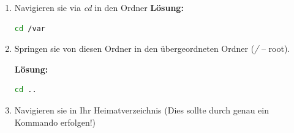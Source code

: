 \documentclass[paper=a4,fontsize=11pt]{scrartcl}%
\numberwithin{equation}{section}
\newenvironment{solution}
	{
		\color{blue}
		\textbf{Lösung:}
	}{}
\begin{document}
\begin{enumerate}
\begin{enumerate}[label=(\alph*)]
		\begin{solution}
		\begin{lstlisting}[style=Bash, language=Bash]
ls
		\end{lstlisting}
		\end{solution}
		\item Navigieren sie via \emph{cd} in den Ordner 
		\begin{solution}
		\begin{lstlisting}[style=Bash, language=Bash]
cd /var
		\end{lstlisting}
		\end{solution}
		\item Springen sie von diesen Ordner in den übergeordneten Ordner (\emph{/} -- root).
		
		\begin{solution}
		\begin{lstlisting}[style=Bash, language=Bash]
cd ..
		\end{lstlisting}
		\end{solution}
		\item Navigieren sie in Ihr Heimatverzeichnis (Dies sollte durch genau ein Kommando erfolgen!)
		

\end{enumerate}
\end{enumerate}
\end{document}
